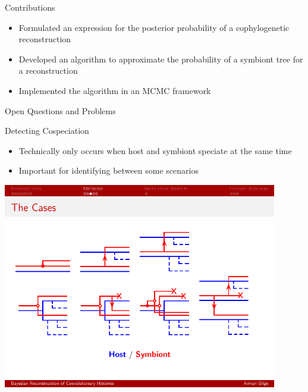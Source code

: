 \documentclass{beamer}
\begin{document}
\begin{frame}{Contributions}

\begin{itemize}

\item Formulated an expression for the posterior probability of a cophylogenetic reconstruction\pause

\item Developed an algorithm to approximate the probability of a symbiont tree for a reconstruction\pause

\item Implemented the algorithm in an MCMC framework

\end{itemize}

\end{frame}

\begin{frame}{Open Questions and Problems}

\begin{block}{Detecting Cospeciation}

\begin{itemize}

\item Technically only occurs when host and symbiont speciate at the same time\pause

\item Important for identifying between some scenarios

\end{itemize}
\centering
\includegraphics[width=0.9\textwidth]{figures/cospeciation-significance.pdf}

\end{block}

\end{frame}
\end{document}
